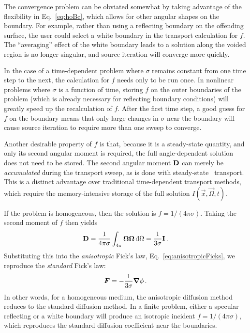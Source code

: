 The convergence problem can be obviated somewhat by taking advantage of the
flexibility in Eq.~\eqref{eq:hoBc}, which allows for other angular shapes on the
boundary. For example, rather than using a reflecting boundary on the offending
surface, the user could select a white boundary in the transport calculation for
$f$. The ``averaging'' effect of the white boundary leads to a solution along
the voided region is no longer singular, and source iteration will converge more
quickly.

In the case of a time-dependent problem where $\sigma$ remains constant from one
time step to the next, the calculation for $f$ needs only to be run once. In
nonlinear problems where $\sigma$ is a function of time, storing $f$ on the
outer boundaries of the problem (which is already necessary for reflecting
boundary conditions) will greatly speed up the recalculation of $f$. After the
first time step, a good guess for $f$ on the boundary means that only
large changes in $\sigma$ near the boundary will cause source iteration to
require more than one sweep to converge.

Another desirable property of $f$ is that, because it is a steady-state
quantity, and only its second angular moment is required, the
full angle-dependent solution does not need to be stored. The second angular
moment $\mathbf{D}$ can merely be \emph{accumulated} during the transport sweep, as
is done with steady-state
\SN\ transport. This is a distinct
advantage over traditional time-dependent transport methods, which require the
memory-intensive storage of the full solution $I(\vec{x},\vec{\Omega},t)$.

If the problem is homogeneous, then the solution is
$f=1/(4\pi\sigma)$. Taking the second moment of $f$ then yields
\begin{equation*}
  \mathbf{D} = \frac{1}{4\pi\sigma} \int_{4\pi} \bm{\Omega} \bm{\Omega} \mathop{}\!\mathrm{d} \Omega
  = \frac{1}{3\sigma} \mathbf{I}\,.
\end{equation*}
Substituting this into the \emph{anisotropic} Fick's law,
Eq.~\eqref{eq:anisotropicFicks}, we reproduce the \emph{standard} Fick's law:
\begin{equation*}
  \bm{F} = - \frac{1}{3\sigma} \bm{\nabla} \phi\,.
\end{equation*}
In other words, for a homogeneous medium, the anisotropic diffusion method
reduces to the standard diffusion method. In a finite problem, either a specular
reflecting or a white boundary will produce an isotropic incident
$f=1/(4\pi\sigma)$, which reproduces the standard diffusion coefficient near the
boundaries.

